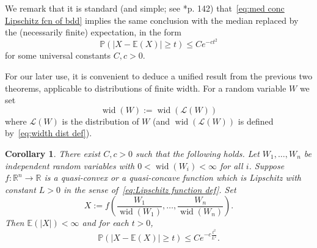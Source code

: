 \documentclass[11pt, reqno]{amsart}
\newtheorem{corollary}[theorem]{Corollary}
\newcommand{\R}{\mathbb{R}}
\newcommand{\E}{\mathbb{E}}
\renewcommand{\P}{\mathbb{P}}
\DeclareMathOperator{\wid}{wid}
\numberwithin{equation}{section}
\begin{document}
We remark that it is standard (and simple; see \cite{MS86}*{p. 142}) that~\eqref{eq:med conc Lipschitz fcn of bdd} implies the same conclusion with the median replaced by the (necessarily finite) expectation, in the form
\begin{equation}\label{eq:exp conc Lipschitz of bdd}
\P(|X - \E(X)|\ge t)\le Ce^{-ct^2}
\end{equation}
for some universal constants $C,c>0$.

For our later use, it is convenient to deduce a unified result from the previous two theorems, applicable to distributions of finite width. For a random variable $W$ we set
\begin{equation}
\wid(W) := \wid(\mathcal{L}(W))
\end{equation}
where $\mathcal{L}(W)$ is the distribution of $W$ (and $\wid(\mathcal{L}(W))$ is defined by~\eqref{eq:width dist def}).
\begin{corollary}\label{cor:concentration with bounded width}
There exist $C,c>0$ such that the following holds. Let $W_1,\ldots, W_n$ be independent random variables with $0<\wid(W_i)<\infty$ for all $i$. Suppose $f\colon \R^n\to\R$ is a quasi-convex or a quasi-concave function which is Lipschitz with constant $L>0$ in the sense of~\eqref{eq:Lipschitz function def}. 
Set
\begin{equation}
X := f\left(\frac{W_1}{\wid(W_1)},\ldots, \frac{W_n}{\wid(W_n)}\right). 
\end{equation}
Then $\E(|X|)<\infty$ and for each $t>0$,
\begin{equation}
\P(|X - \E(X)|\ge t)\le Ce^{-c\frac{t^2}{L^2}}.
\end{equation}
\end{corollary}
\end{document}
